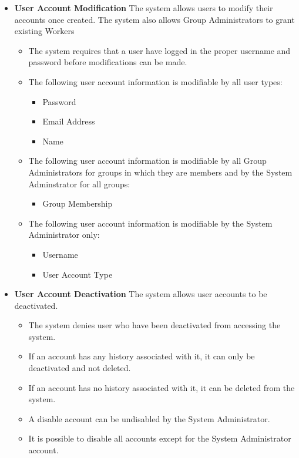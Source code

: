 \documentclass{report}
\begin{document}
\begin{itemize}
\begin{itemize}
					\end{itemize}
				\item \textbf{User Account Modification} The system allows users 
				to modify their accounts once created. The system also allows 
				Group Administrators to grant existing Workers 
				\begin{itemize}
					\item The system requires that a user have logged in the 
					proper username and password before modifications can be 
					made.
					\item The following user account information is modifiable 
					by all user types:
						\begin{itemize}
							\item Password
							\item Email Address
							\item Name
						\end{itemize}

					\item The following user account information is modifiable
					by all Group Administrators for groups in which they are 
						members and by the System Adminstrator for all groups:
						\begin{itemize}
							\item Group Membership
						\end{itemize}

					\item The following user account information is modifiable
					by the System Administrator only:
						\begin{itemize}
							\item Username
							\item User Account Type
						\end{itemize}
				\end{itemize}
				
				\item \textbf{User Account Deactivation} The system allows user 
				accounts to be deactivated.
					\begin{itemize}
						\item The system denies user who have been deactivated 
						from accessing the system.
						\item If an account has any history associated with it, 
						it can only be deactivated and not deleted.
						\item If an account has no history associated with it, 
						it can be deleted from the system.
						\item A disable account can be undisabled by the System 
						Administrator.
						\item It is possible to disable all accounts except for 
						the System Administrator account.
					\end{itemize}					


\end{itemize}
\end{document}
